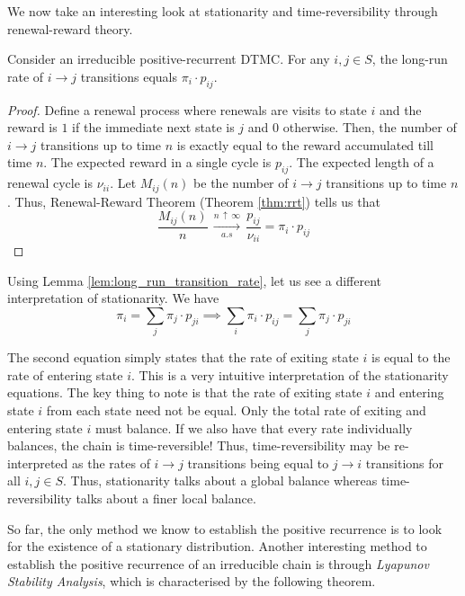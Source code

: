 \documentclass[12pt]{article}
\theoremstyle{definition}
\begin{document}
\medskip

We now take an interesting look at stationarity and time-reversibility through renewal-reward theory. 

\begin{lem} \label{lem:long_run_transition_rate}
    Consider an irreducible positive-recurrent DTMC. For any $i,j \in S$, the long-run rate of $i \to j$ transitions equals $\pi_i \cdot p_{ij}$. 
\end{lem}

\begin{proof}
    Define a renewal process where renewals are visits to state $i$ and the reward is $1$ if the immediate next state is $j$ and $0$ otherwise. Then, the number of $i \to j$ transitions up to time $n$ is exactly equal to the reward accumulated till time $n$. The expected reward in a single cycle is $p_{ij}$. The expected length of a renewal cycle is $\nu_{ii}$. Let $M_{ij}(n)$ be the number of $i \to j$ transitions up to time $n$. Thus, Renewal-Reward Theorem (Theorem \ref{thm:rrt}) tells us that
    \[
        \frac{M_{ij}(n)}{n} \, \xrightarrow[a.s]{n \, \uparrow \, \infty} \, \frac{p_{ij}}{\nu_{ii}} = \pi_i \cdot p_{ij}
    \]
    \end{proof}
    
    Using Lemma \ref{lem:long_run_transition_rate}, let us see a different interpretation of stationarity. We have
    \[
        \pi_i = \sum_j \pi_j \cdot p_{ji} \implies \sum_i \pi_i \cdot p_{ij} = \sum_j \pi_j \cdot p_{ji}
    \]

    The second equation simply states that the rate of exiting state $i$ is equal to the rate of entering state $i$. This is a very intuitive interpretation of the stationarity equations. The key thing to note is that the rate of exiting state $i$ and entering state $i$ from each state need not be equal. Only the total rate of exiting and entering state $i$ must balance. If we also have that every rate individually balances, the chain is time-reversible! Thus, time-reversibility may be re-interpreted as the rates of $i \to j$ transitions being equal to $j \to i$ transitions for all $i,j \in S$. Thus, stationarity talks about a global balance whereas time-reversibility talks about a finer local balance.
    
    \medskip
    
    So far, the only method we know to establish the positive recurrence is to look for the existence of a stationary distribution. Another interesting method to establish the positive recurrence of an irreducible chain is through \emph{Lyapunov Stability Analysis}, which is characterised by the following theorem. 
    
\end{document}
